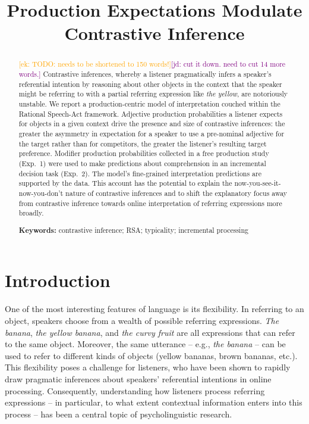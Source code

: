 \documentclass[10pt,letterpaper]{article}
\title{Production Expectations Modulate Contrastive Inference}
\newcommand{\ek}[1]{\textcolor{Orange}{[ek: #1]}}
\newcommand{\jd}[1]{\textcolor{Purple}{[jd: #1]}}
\begin{document}
\maketitle

\begin{abstract}
\ek{TODO: needs to be shortened to 150 words!}\jd{cut it down. need to cut 14 more words.}
Contrastive inferences, whereby a listener pragmatically infers a speaker's  referential intention by reasoning about other objects in the context that the speaker might be referring to with a partial referring expression like \emph{the yellow}, are notoriously unstable. We report a production-centric model of interpretation couched within the Rational Speech-Act framework. Adjective production probabilities a listener expects for objects in a given context drive the presence and size of contrastive inferences: the greater the asymmetry in expectation for a speaker to use a pre-nominal adjective for the target rather than for competitors, the greater the listener's resulting  target preference. Modifier production probabilities collected in a free production study (Exp.~1) were used to make predictions about comprehension in an incremental decision task (Exp.~2). The model's fine-grained interpretation predictions are supported by the data. This account has the potential to explain the now-you-see-it-now-you-don't nature of contrastive inferences and to shift the explanatory focus away from contrastive inference towards online interpretation of referring expressions more broadly.


\textbf{Keywords:} 
contrastive inference; RSA; typicality; incremental processing
\end{abstract}

\section{Introduction}

One of the most interesting features of language is its flexibility. In referring to an object, speakers choose from a wealth of possible referring expressions. \textit{The banana}, \textit{the yellow banana}, and \textit{the curvy fruit}  are all expressions that can refer to the same object. Moreover, the same utterance -- e.g., \textit{the banana} -- can be used to refer to different kinds of objects (yellow bananas, brown bananas, etc.). This flexibility poses a challenge for listeners, who have been shown to rapidly draw pragmatic inferences about speakers' referential intentions in online processing. Consequently, understanding how listeners process referring expressions -- in particular, to what extent contextual information enters into this process -- has been a central topic of psycholinguistic research.
\end{document}
